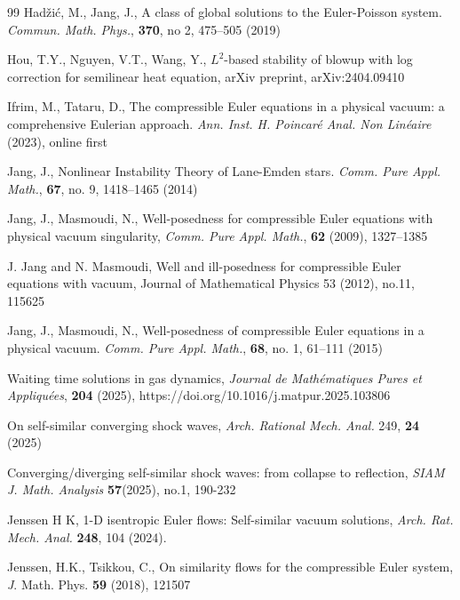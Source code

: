 \documentclass{article}
\numberwithin{equation}{section}
\begin{document}
\begin{thebibliography}{99}
Had\v zi\'c, M., Jang, J.,
A class of global solutions to the Euler-Poisson system.
{\em Commun. Math. Phys.}, {\bf 370}, no 2, 475--505 (2019)

 Hou, T.Y., Nguyen, V.T., Wang, Y., {$L^2$}-based stability of blowup with log correction for semilinear heat equation, arXiv preprint, arXiv:2404.09410




Ifrim, M., Tataru, D., 
The compressible Euler equations in a physical vacuum: a comprehensive Eulerian approach.
\textit{Ann. Inst. H. Poincar\'{e} Anal. Non Lin\'{e}aire} (2023), online first










Jang, J.,
Nonlinear Instability Theory of Lane-Emden stars.  
{\em Comm. Pure Appl. Math.}, {\bf 67}, no. 9, 1418--1465 (2014)


Jang, J., Masmoudi, N.,
Well-posedness for compressible Euler equations with physical vacuum singularity, {\em Comm. Pure Appl. Math.}, {\bf 62} (2009), 1327--1385 

 J. Jang and N. Masmoudi, Well and ill-posedness for compressible Euler equations with vacuum, Journal of Mathematical Physics 53 (2012), no.11, 115625


Jang, J., Masmoudi, N.,
Well-posedness of compressible Euler equations in a physical vacuum.
{\em Comm. Pure Appl. Math.},
{\bf 68}, no. 1, 61--111 (2015)


Waiting time solutions in gas dynamics, \emph{{Journal de Mathématiques Pures et Appliquées}}, \textbf{204} (2025), https://doi.org/10.1016/j.matpur.2025.103806

 On self-similar converging shock waves,  \emph{Arch. Rational Mech. Anal.} 249, \textbf{24} (2025)

 Converging/diverging self-similar shock waves: from collapse to reflection, \emph{SIAM J. Math. Analysis} \textbf{57}(2025), no.1,  190-232

 Jenssen H K, 1-D isentropic Euler flows: Self-similar vacuum solutions, {\em Arch. Rat. Mech. Anal.}  {\bf 248}, 104 (2024). 

{Jenssen, H.K.,  Tsikkou, C.},  
 On similarity flows for the compressible Euler system, 
{\emph J. Math. Phys.} \textbf{59} (2018), 121507


\end{thebibliography}
\end{document}
